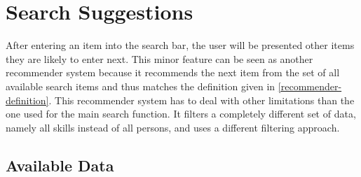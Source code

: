 \section{Search Suggestions}
\label{autocomplete}
After entering an item into the search bar, the user will be presented other items they are likely to enter next. This minor feature can be seen as another
recommender system because it recommends the next item from the set of all available search items and thus matches the definition given in \ref{recommender-definition}. This recommender system has to deal with other limitations than the one used for the main search function. It filters a completely different set of data, namely all skills instead of all persons, and uses a different filtering approach.

\subsection{Available Data}
